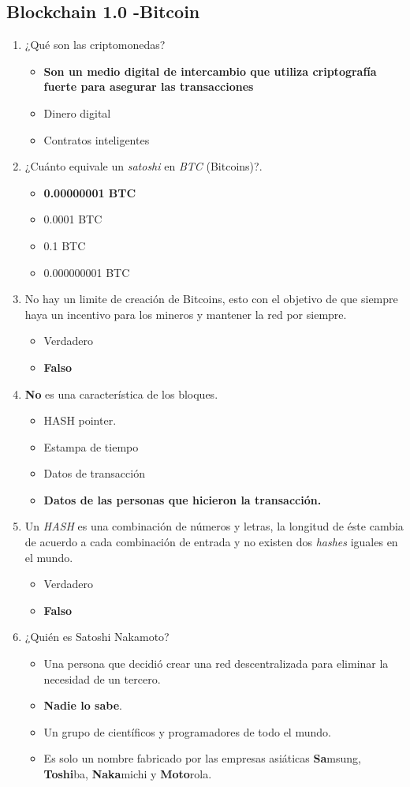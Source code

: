 \documentclass[a4paper,12pt]{/home/armando/Documentos/Cursos/LaTeX/Plantillas/lib/pub}
\begin{document}
\subsection{Blockchain 1.0 -Bitcoin}
\begin{enumerate}
	\item ¿Qué son las criptomonedas?
	\begin{itemize}
		\item \textbf{Son un medio digital de intercambio que utiliza criptografía fuerte para asegurar las transacciones}
		\item Dinero digital
		\item Contratos inteligentes
	\end{itemize}
	\item ¿Cuánto equivale un \textit{satoshi} en \textit{BTC} (Bitcoins)?.
	\begin{itemize}
		\item \textbf{0.00000001 BTC}
		\item 0.0001 BTC
		\item 0.1 BTC
		\item 0.000000001 BTC
	\end{itemize}
	\item No hay un limite de creación de Bitcoins, esto con el objetivo de que siempre haya un incentivo para los mineros y mantener la red por siempre.
	\begin{itemize}
		\item Verdadero
		\item \textbf{Falso}
	\end{itemize}
	\item \textbf{No} es una característica de los bloques.
	\begin{itemize}
		\item HASH pointer.
		\item Estampa de tiempo
		\item Datos de transacción
		\item \textbf{Datos de las personas que hicieron la transacción.}
	\end{itemize}
	\item Un \textit{HASH} es una combinación de números y letras, la longitud de éste cambia de acuerdo a cada combinación de entrada y no existen dos \textit{hashes} iguales en el mundo.
	\begin{itemize}
		\item Verdadero
		\item \textbf{Falso}
	\end{itemize}
	\item ¿Quién es Satoshi Nakamoto?
	\begin{itemize}
		\item Una persona que decidió crear una red descentralizada para eliminar la necesidad de un tercero.
		\item \textbf{Nadie lo sabe}.
		\item Un grupo de científicos y programadores de todo el mundo.
		\item Es solo un nombre fabricado por las empresas asiáticas \textbf{Sa}msung, \textbf{Toshi}ba, \textbf{Naka}michi y \textbf{Moto}rola.
	\end{itemize}
\end{enumerate}
\end{document}
